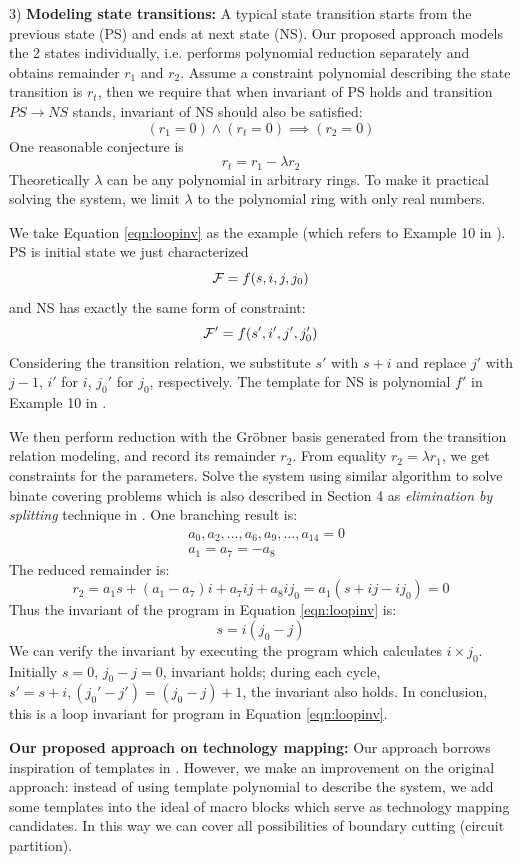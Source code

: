 3) {\bf Modeling state transitions:}
A typical state transition starts from the previous state (PS) and ends at next state (NS). 
Our proposed approach models the 2 states individually,
{i.e.} performs polynomial reduction separately and obtains remainder $r_1$ and $r_2$. 
Assume a constraint polynomial describing
the state transition is $r_t$, then we require that when invariant of PS holds and transition $PS \to NS$ stands,
invariant of NS should also be satisfied:
$$(r_1 = 0)\land (r_t = 0) \implies (r_2 = 0)$$
One reasonable conjecture is
$$r_t = r_1 - \lambda r_2$$
Theoretically $\lambda$ can be any polynomial in arbitrary rings. To make it practical solving the system, 
we limit $\lambda$ to the polynomial ring with only real numbers.

We take Equation \ref{eqn:loopinv} as the example (which refers to Example 10 in \cite{sankaranarayanan2004non}). 
PS is initial state we just characterized 
$${\mathcal{F}} = f(s,i,j,j_0)$$ 
and NS has exactly the same form of constraint:
$${\mathcal{F}}' = f(s',i',j',j_0')$$
Considering the transition relation, we substitute $s'$ with $s+i$ and replace $j'$
with $j-1$, $i'$ for $i$, $j_0'$ for $j_0$, respectively. 
The template for NS is polynomial $f'$ in Example 10 in \cite{sankaranarayanan2004non}.

We then perform reduction with the Gr\"obner basis generated from the transition relation modeling, 
and record its remainder $r_2$.
From equality $r_2 = \lambda r_1$, we get constraints for the parameters. Solve the system using 
similar algorithm to solve binate covering problems
which is also described in Section 4 as \emph{elimination by splitting} technique in \cite{sankaranarayanan2004non}. 
One branching result is:
\begin{align*}
&a_0,a_2,\dots, a_6, a_9,\dots,a_{14}=  0\\ 
&a_1=a_7=-a_8
\end{align*}
The reduced remainder is: 
$$r_2 = a_1s +(a_1-a_7)i+a_7ij+a_8ij_0 = a_1(s+ij-ij_0) = 0$$
Thus the invariant of the program in Equation \ref{eqn:loopinv} is:
$$s = i(j_0- j)$$
We can verify the invariant by executing the program which calculates $i\times j_0$. 
Initially $s=0$, $j_0-j=0$, invariant holds;
during each cycle, $s'=s+i, (j_0'-j') = (j_0-j)+1$, the invariant also holds. In conclusion, this is a
loop invariant for program in Equation \ref{eqn:loopinv}.

{\bf Our proposed approach on technology mapping:}
Our approach borrows inspiration of templates in \cite{sankaranarayanan2004non}. However, we make an improvement
on the original approach:
instead of using template polynomial to describe the system, we add some templates into the ideal
of macro blocks which serve as technology mapping candidates. In this way we can cover all possibilities
of boundary cutting (circuit partition).

